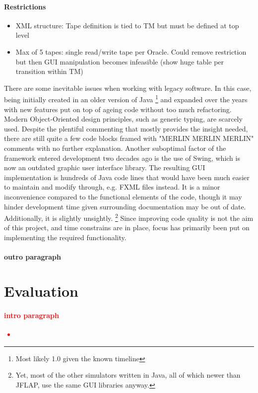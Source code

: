 \documentclass[12pt,a4,xcolor=table]{article}
\begin{document}
{	\paragraph{Restrictions}		
	\begin{itemize}
		\item XML structure:  Tape definition  is tied to TM but must be defined at top level
		\item Max of 5 tapes: single read/write tape per Oracle. Could remove restriction but then GUI manipulation becomes infeasible (show huge table per transition within TM)
	\end{itemize}
		There are some inevitable issues when working with legacy software. In this case, being initially created in an older version of Java \footnote{Most likely 1.0 given the known timeline\cite{procopiuc1996visualization}} and expanded over the years with new features put on top of ageing code without too much refactoring. Modern Object-Oriented design principles, such as generic typing, are scarcely used. Despite the plentiful commenting that mostly provides the insight needed, there are still quite a few code blocks framed with "MERLIN MERLIN MERLIN" comments with no further explanation. 
		Another suboptimal factor of the framework entered development two decades ago is the use of Swing, which is now an outdated graphic user interface library. The resulting GUI implementation is hundreds of Java code lines that would have been much easier to maintain and modify through, e.g. FXML files instead. It is a minor inconvenience compared to the functional elements of the code, though it may hinder development time given surrounding documentation may be out of date. Additionally, it is slightly unsightly.  \footnote{Yet, most of the other simulators written in Java, all of which newer than JFLAP, use the same GUI libraries anyway.} 
		Since improving code quality is not the aim of this project, and time constrains are in place, focus has primarily been put on implementing the required functionality.
		\paragraph{outro paragraph}
	}
	
	
	\section{Evaluation}
	\textcolor{red}{
	\paragraph{intro paragraph}
	\begin{itemize}
		\item 
	\end{itemize}
	}
\end{document}
